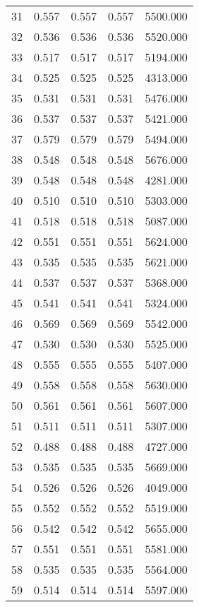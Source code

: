 \begin{tabular}{rrrrr}
31 & 0.557 & 0.557 & 0.557 & 5500.000 \\
32 & 0.536 & 0.536 & 0.536 & 5520.000 \\
33 & 0.517 & 0.517 & 0.517 & 5194.000 \\
34 & 0.525 & 0.525 & 0.525 & 4313.000 \\
35 & 0.531 & 0.531 & 0.531 & 5476.000 \\
36 & 0.537 & 0.537 & 0.537 & 5421.000 \\
37 & 0.579 & 0.579 & 0.579 & 5494.000 \\
38 & 0.548 & 0.548 & 0.548 & 5676.000 \\
39 & 0.548 & 0.548 & 0.548 & 4281.000 \\
40 & 0.510 & 0.510 & 0.510 & 5303.000 \\
41 & 0.518 & 0.518 & 0.518 & 5087.000 \\
42 & 0.551 & 0.551 & 0.551 & 5624.000 \\
43 & 0.535 & 0.535 & 0.535 & 5621.000 \\
44 & 0.537 & 0.537 & 0.537 & 5368.000 \\
45 & 0.541 & 0.541 & 0.541 & 5324.000 \\
46 & 0.569 & 0.569 & 0.569 & 5542.000 \\
47 & 0.530 & 0.530 & 0.530 & 5525.000 \\
48 & 0.555 & 0.555 & 0.555 & 5407.000 \\
49 & 0.558 & 0.558 & 0.558 & 5630.000 \\
50 & 0.561 & 0.561 & 0.561 & 5607.000 \\
51 & 0.511 & 0.511 & 0.511 & 5307.000 \\
52 & 0.488 & 0.488 & 0.488 & 4727.000 \\
53 & 0.535 & 0.535 & 0.535 & 5669.000 \\
54 & 0.526 & 0.526 & 0.526 & 4049.000 \\
55 & 0.552 & 0.552 & 0.552 & 5519.000 \\
56 & 0.542 & 0.542 & 0.542 & 5655.000 \\
57 & 0.551 & 0.551 & 0.551 & 5581.000 \\
58 & 0.535 & 0.535 & 0.535 & 5564.000 \\
59 & 0.514 & 0.514 & 0.514 & 5597.000 \\
\bottomrule
\end{tabular}
